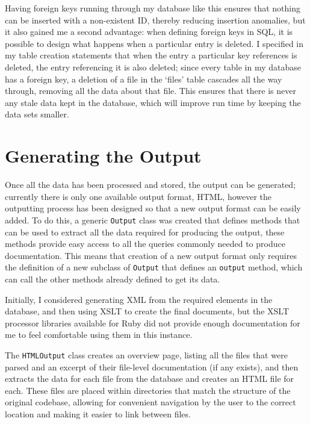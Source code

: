       Having foreign keys running through my database like this ensures that
      nothing can be inserted with a non-existent ID, thereby reducing insertion
      anomalies, but it also gained me a second advantage: when defining foreign
      keys in SQL, it is possible to design what happens when a particular entry
      is deleted. I specified in my table creation statements that when the
      entry a particular key references is deleted, the entry referencing it is
      also deleted; since every table in my database has a foreign key, a
      deletion of a file in the `files' table cascades all the way through,
      removing all the data about that file. This ensures that there is never
      any stale data kept in the database, which will improve run time by
      keeping the data sets smaller.

\section{Generating the Output}

Once all the data has been processed and stored, the output can be generated;
currently there is only one available output format, HTML, however the
outputting process has been designed so that a new output format can be easily
added. To do this, a generic \lstinline|Output| class was created that defines
methods that can be used to extract all the data required for producing the
output, these methods provide easy access to all the queries commonly needed to
produce documentation. This means that creation of a new output format only
requires the definition of a new subclass of \lstinline|Output| that defines an
\lstinline|output| method, which can call the other methods already defined to
get its data.

Initially, I considered generating XML from the required elements in the
database, and then using XSLT to create the final documents, but the XSLT
processor libraries available for Ruby did not provide enough documentation for
me to feel comfortable using them in this instance.

The \lstinline|HTMLOutput| class creates an overview page, listing all the files
that were parsed and an excerpt of their file-level documentation (if any
exists), and then extracts the data for each file from the database and creates
an HTML file for each. These files are placed within directories that match the
structure of the original codebase, allowing for convenient navigation by the
user to the correct location and making it easier to link between files.

